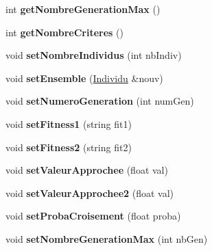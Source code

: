 \begin{DoxyCompactItemize}
\item 
\mbox{\label{class_population_aa07616afcf9ba7435e6648925a9dd73a}} 
int {\bfseries get\+Nombre\+Generation\+Max} ()
\item 
\mbox{\label{class_population_aa55e37f348f9de0e3b2fe9a0de7d2bb3}} 
int {\bfseries get\+Nombre\+Criteres} ()
\item 
\mbox{\label{class_population_ac6f1644f7297b6b9521409b332f51f0d}} 
void {\bfseries set\+Nombre\+Individus} (int nb\+Indiv)
\item 
\mbox{\label{class_population_a1c15a197054721dfbcdbb4a7882b3e95}} 
void {\bfseries set\+Ensemble} (\hyperlink{class_individu}{Individu} \&nouv)
\item 
\mbox{\label{class_population_a556851b48bc213bc9a5624295710276d}} 
void {\bfseries set\+Numero\+Generation} (int num\+Gen)
\item 
\mbox{\label{class_population_a7573ba5ab354228ffcb76c7dd43b5205}} 
void {\bfseries set\+Fitness1} (string fit1)
\item 
\mbox{\label{class_population_af5940422c47c86ea6eb606224016d32d}} 
void {\bfseries set\+Fitness2} (string fit2)
\item 
\mbox{\label{class_population_ad3e0a26ca7b57924bcbb7a57d86056e4}} 
void {\bfseries set\+Valeur\+Approchee} (float val)
\item 
\mbox{\label{class_population_aa5645305dfca65e640ed76da9f851137}} 
void {\bfseries set\+Valeur\+Approchee2} (float val)
\item 
\mbox{\label{class_population_a175f3a21b85681e318063e9eb63550a8}} 
void {\bfseries set\+Proba\+Croisement} (float proba)
\item 
\mbox{\label{class_population_a85da2cfbfb4cde5c3ed879958385904c}} 
void {\bfseries set\+Nombre\+Generation\+Max} (int nb\+Gen)
\item 
\mbox{\label{class_population_afe14ed3d2919840291b623029eaaf8d3}} 

\end{DoxyCompactItemize}
